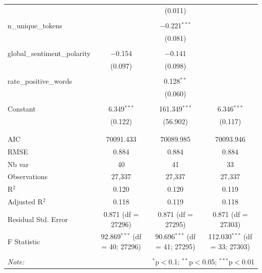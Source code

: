 \begin{table}[!htbp]
\begin{tabular}{@{\extracolsep{5pt}}lccc}
  &  & (0.011) &  \\ 
  & & & \\ 
 n\_unique\_tokens &  & $-$0.221$^{***}$ &  \\ 
  &  & (0.081) &  \\ 
  & & & \\ 
 global\_sentiment\_polarity & $-$0.154 & $-$0.141 &  \\ 
  & (0.097) & (0.098) &  \\ 
  & & & \\ 
 rate\_positive\_words &  & 0.128$^{**}$ &  \\ 
  &  & (0.060) &  \\ 
  & & & \\ 
 Constant & 6.349$^{***}$ & 161.349$^{***}$ & 6.346$^{***}$ \\ 
  & (0.122) & (56.902) & (0.117) \\ 
  & & & \\ 
\hline \\[-1.8ex] 
AIC & 70091.433 & 70089.985 & 70093.946 \\ 
RMSE & 0.884 & 0.884 & 0.884 \\ 
Nb var & 40 & 41 & 33 \\ 
Observations & 27,337 & 27,337 & 27,337 \\ 
R$^{2}$ & 0.120 & 0.120 & 0.119 \\ 
Adjusted R$^{2}$ & 0.118 & 0.119 & 0.118 \\ 
Residual Std. Error & 0.871 (df = 27296) & 0.871 (df = 27295) & 0.871 (df = 27303) \\ 
F Statistic & 92.869$^{***}$ (df = 40; 27296) & 90.696$^{***}$ (df = 41; 27295) & 112.030$^{***}$ (df = 33; 27303) \\ 
\hline 
\hline \\[-1.8ex] 
\textit{Note:}  & \multicolumn{3}{r}{$^{*}$p$<$0.1; $^{**}$p$<$0.05; $^{***}$p$<$0.01} \\ 
\end{tabular} 
\end{table} 
